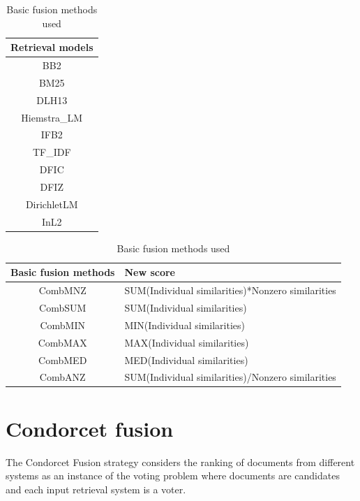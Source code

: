 	\begin{table} [H]
		\begin{minipage} {0.3\linewidth}
			\centering
			\begin{tabular}{c}
				\toprule
				\textbf{Retrieval models} \\ \toprule
				BB2 \\
				BM25 \\
				DLH13 \\
				Hiemstra\_LM \\
				IFB2 \\
				TF\_IDF \\
				DFIC \\
				DFIZ \\
				DirichletLM \\
				InL2 \\
				\bottomrule
			\end{tabular}
			\caption{Retrieval models used}
			\label{tab:10Mod}
		\end{minipage}		
		\begin{minipage} {0.7\linewidth}
			\centering
			\begin{tabular}{c p{4cm}}
				\toprule
				\textbf{Basic fusion methods} & \textbf{New score} \\ \toprule
				CombMNZ & SUM(Individual similarities)*Nonzero similarities \\ \hline
				CombSUM & SUM(Individual similarities) \\ \hline
				CombMIN & MIN(Individual similarities) \\ \hline
				CombMAX & MAX(Individual similarities) \\ \hline
				CombMED & MED(Individual similarities) \\ \hline
				CombANZ & SUM(Individual similarities)/Nonzero similarities \\ \bottomrule
			\end{tabular}
			\caption{Basic fusion methods used}
			\label{tab:6Fus}
		\end{minipage}		
	\end{table}
    
    \section{Condorcet fusion}
    The Condorcet Fusion strategy considers the ranking of documents from different systems as an instance of the voting problem where documents are candidates and each input retrieval system is a voter.
    
